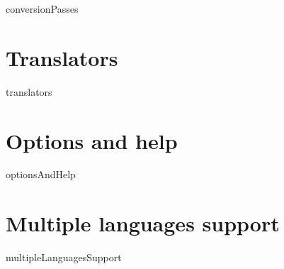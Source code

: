 \documentclass[12pt,a4paper]{article}
\begin{document}
{conversionPasses}


\section{Translators}

{translators}


\section{Options and help}

{optionsAndHelp}


\section{Multiple languages support}

{multipleLanguagesSupport}


\end{document}
